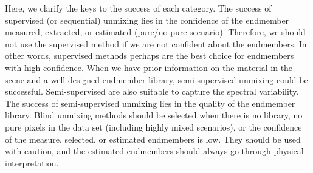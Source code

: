 Here, we clarify the keys to the success of each category. The success of supervised (or sequential) unmixing lies in the confidence of the endmember measured, extracted, or estimated (pure/no pure scenario). Therefore, we should not use the supervised method if we are not confident about the endmembers. In other words, supervised methods perhaps are the best choice for endmembers with high confidence. When we have prior information on the material in the scene and a well-designed endmember library, semi-supervised unmixing could be successful. Semi-supervised are also suitable to capture the spectral variability. The success of semi-supervised unmixing lies in the quality of the endmember library. Blind unmixing methods should be selected when there is no library, no pure pixels in the data set (including highly mixed scenarios), or the confidence of the measure, selected, or estimated endmembers is low. They should be used with caution, and the estimated endmembers should always go through physical interpretation. 
